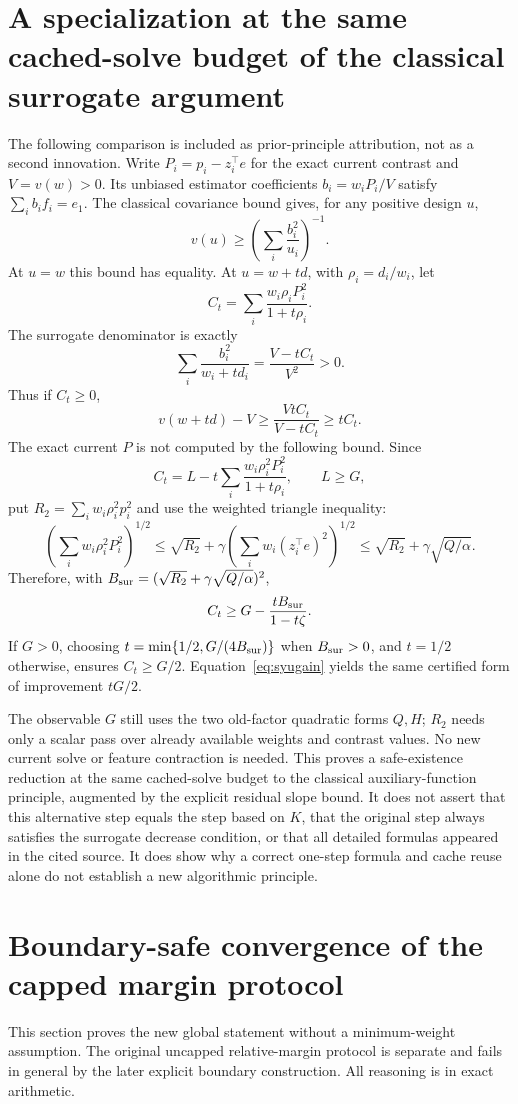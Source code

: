 \documentclass[11pt]{article}
\begin{document}
\section{A specialization at the same cached-solve budget of the classical surrogate argument}
The following comparison is included as prior-principle attribution, not as a second innovation. Write $P_i=p_i-z_i^\top e$ for the exact current contrast and $V=v(w)>0$. Its unbiased estimator coefficients $b_i=w_iP_i/V$ satisfy $\sum_i b_i f_i=e_1$. The classical covariance bound gives, for any positive design $u$,
\[
 v(u)\ge\left(\sum_i\frac{b_i^2}{u_i}\right)^{-1}.
\]
At $u=w$ this bound has equality. At $u=w+td$, with $\rho_i=d_i/w_i$, let
\[
 C_t=\sum_i\frac{w_i\rho_iP_i^2}{1+t\rho_i}.
\]
The surrogate denominator is exactly
\[
 \sum_i\frac{b_i^2}{w_i+td_i}
 =\frac{V-tC_t}{V^2}>0.
\]
Thus if $C_t\ge0$,
\begin{equation}\label{eq:syugain}
 v(w+td)-V\ge\frac{VtC_t}{V-tC_t}\ge tC_t.
\end{equation}
The exact current $P$ is not computed by the following bound. Since
\[
 C_t=L-t\sum_i\frac{w_i\rho_i^2P_i^2}{1+t\rho_i},\qquad L\ge G,
\]
put $R_2=\sum_iw_i\rho_i^2p_i^2$ and use the weighted triangle inequality:
\[
 \left(\sum_iw_i\rho_i^2P_i^2\right)^{1/2}
 \le\sqrt{R_2}+\gamma\left(\sum_iw_i(z_i^\top e)^2\right)^{1/2}
 \le\sqrt{R_2}+\gamma\sqrt{Q/\alpha}.
\]
Therefore, with $B_{\rm sur}=(\sqrt{R_2}+\gamma\sqrt{Q/\alpha})^2$,
\[
 C_t\ge G-\frac{tB_{\rm sur}}{1-t\zeta}.
\]
If $G>0$, choosing $t=\min\{1/2,G/(4B_{\rm sur})\}$ when $B_{\rm sur}>0$, and $t=1/2$ otherwise, ensures $C_t\ge G/2$. Equation~\eqref{eq:syugain} yields the same certified form of improvement $tG/2$.

The observable $G$ still uses the two old-factor quadratic forms $Q,H$; $R_2$ needs only a scalar pass over already available weights and contrast values. No new current solve or feature contraction is needed. This proves a safe-existence reduction at the same cached-solve budget to the classical auxiliary-function principle, augmented by the explicit residual slope bound. It does not assert that this alternative step equals the step based on $K$, that the original step always satisfies the surrogate decrease condition, or that all detailed formulas appeared in the cited source. It does show why a correct one-step formula and cache reuse alone do not establish a new algorithmic principle.

\section{Boundary-safe convergence of the capped margin protocol}
This section proves the new global statement without a minimum-weight assumption. The original uncapped relative-margin protocol is separate and fails in general by the later explicit boundary construction. All reasoning is in exact arithmetic.
\end{document}
